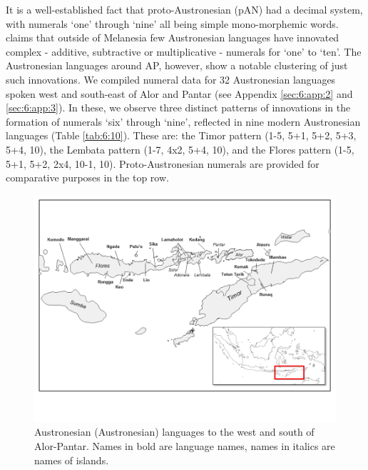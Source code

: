 It is a well-established fact that proto-Austronesian (pAN) had a decimal system, with numerals `one' through `nine' all being simple mono-morphemic words. \citet[268]{Blust2009} claims that outside of Melanesia few Austronesian languages have innovated complex - additive, subtractive or multiplicative - numerals for `one' to `ten'. The Austronesian languages around AP, however, show a notable clustering of just such innovations. We compiled numeral data for 32 Austronesian languages spoken west and south-east of Alor and Pantar (see Appendix \ref{sec:6:app:2} and \ref{sec:6:app:3}). In these, we observe three distinct patterns of innovations in the formation of numerals `six' through `nine', reflected in nine modern Austronesian languages (Table \ref{tab:6:10}). These are: the Timor pattern (1-5, 5+1, 5+2, 5+3, 5+4, 10), the Lembata pattern (1-7, 4x2, 5+4, 10), and the Flores pattern (1-5, 5+1, 5+2, 2x4, 10-1, 10). Proto-Austronesian numerals are provided for comparative purposes in the top row. 

\begin{figure}
\includegraphics[width=\textwidth]{figures/ch7fig1.png}
\caption{Austronesian (Austronesian) languages to the west and south of Alor{}-Pantar. Names in bold are language names, names in italics are names of islands.}
\label{fig:6:1}
\end{figure}
 
